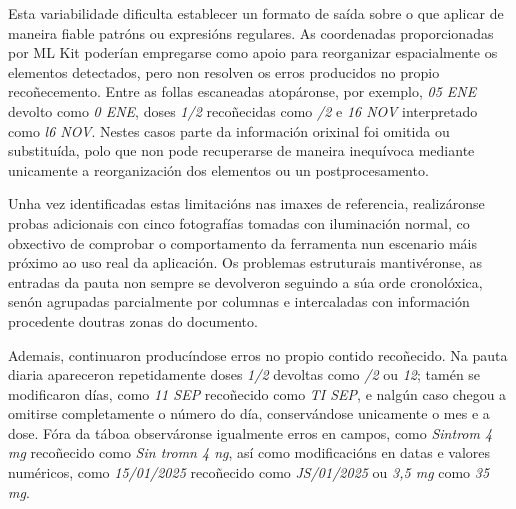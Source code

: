 Esta variabilidade dificulta establecer un formato de saída sobre o que aplicar de maneira fiable patróns ou expresións regulares. As coordenadas proporcionadas por ML Kit poderían empregarse como apoio para reorganizar espacialmente os elementos detectados, pero non resolven os erros producidos no propio recoñecemento. Entre as follas escaneadas atopáronse, por exemplo, \textit{05 ENE} devolto como \textit{0 ENE}, doses \textit{1/2} recoñecidas como \textit{/2} e \textit{16 NOV} interpretado como
\textit{l6 NOV}. Nestes casos parte da información orixinal foi omitida ou substituída, polo que non pode recuperarse de maneira inequívoca mediante unicamente a reorganización dos elementos ou un postprocesamento.


Unha vez identificadas estas limitacións nas imaxes de referencia, realizáronse probas adicionais con cinco fotografías tomadas con iluminación normal, co obxectivo de comprobar o comportamento da ferramenta nun escenario máis próximo ao uso real da aplicación. Os problemas estruturais mantivéronse, as entradas da pauta non sempre se devolveron seguindo a súa orde cronolóxica, senón agrupadas parcialmente por columnas e intercaladas con información procedente doutras zonas do documento.

Ademais, continuaron producíndose erros no propio contido recoñecido. Na pauta diaria apareceron repetidamente doses \textit{1/2} devoltas como \textit{/2} ou \textit{12}; tamén se modificaron días, como \textit{11 SEP} recoñecido como \textit{TI SEP}, e nalgún caso chegou a omitirse completamente o número do día, conservándose unicamente o mes e a dose. Fóra da táboa observáronse igualmente erros en campos, como \textit{Sintrom 4 mg} recoñecido como \textit{Sin tromn 4 ng}, así como modificacións en datas e valores numéricos, como \textit{15/01/2025} recoñecido como \textit{JS/01/2025} ou \textit{3,5 mg} como \textit{35 mg}.

%
%
%

